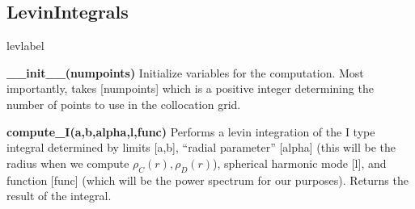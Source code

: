 \documentclass[10pt,a4paper]{article}
\begin{document}
\subsection{LevinIntegrals}
\begin{labeling}{levlabel}
	\item[\textbf{\_\_init\_\_(numpoints)}] Initialize variables for the computation. Most importantly, takes [numpoints] which is a positive integer determining the number of points to use in the collocation grid.
	
	\item[\textbf{compute\_I(a,b,alpha,l,func)}] Performs a levin integration of the I type integral determined by limits [a,b], 
	``radial parameter'' [alpha] (this will be the radius when we compute $\rho_C(r),\rho_D(r)$), spherical harmonic mode [l], and function [func] (which will be the power spectrum for our purposes). Returns the result of the integral.
\end{labeling}
\end{document}
